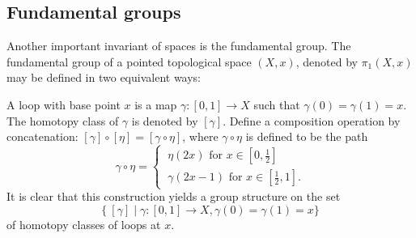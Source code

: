 \subsection{Fundamental groups}
Another important invariant of spaces is the fundamental group. The fundamental group of a pointed topological space $(X,x)$, denoted by $\pi_1(X,x)$ may be defined in two equivalent ways:
\begin{construction}
    A loop with base point $x$ is a map $\gamma : [0,1] \to X$ such that $\gamma(0) = \gamma(1) = x$. The homotopy class of $\gamma $ is denoted by $[\gamma]$. Define a composition operation by concatenation: $[\gamma] \circ [\eta] = [\gamma \circ \eta]$, where $\gamma \circ \eta$ is defined to be the path 
    \[\gamma \circ \eta =
        \begin{cases}
            \ \eta(2x) \text{ for } x \in [0, \tfrac{1}{2}]\\
            \ \gamma(2x - 1) \text{ for } x \in [\tfrac{1}{2}, 1].
        \end{cases}
    \]
    It is clear that this construction yields a group structure on the set 
    \[
        \{\ [\gamma] \mid \gamma : [0,1] \to X , \gamma(0) = \gamma(1) = x \}
    \]
    of homotopy classes of loops at $x$.
\end{construction}

